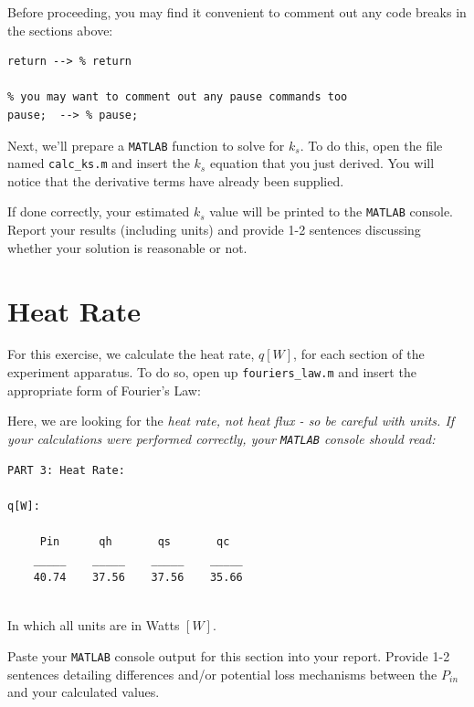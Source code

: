 \documentclass[11pt, letterpaper]{article}
\begin{document}
 Before proceeding, you may find it convenient to comment out any code breaks in the sections above:

\n
\begin{lstlisting}[numbers=none]
% comment out any return calls above
return --> % return

% you may want to comment out any pause commands too
pause;  --> % pause;
\end{lstlisting}

\n
Next, we'll prepare a \texttt{MATLAB} function to solve for $k_s$. To do this, open the file named \texttt{calc\_ks.m} and insert the $k_s$ equation that you just derived. You will notice that the derivative terms have already been supplied.

\begin{formal}
    \begin{deliv}  
    If done correctly, your estimated $k_s$ value will be printed to the \texttt{MATLAB} console. Report your results (including units) and provide 1-2 sentences discussing whether your solution is reasonable or not.
    \end{deliv}
\end{formal}


\section{Heat Rate}

For this exercise, we calculate the heat rate, $q [W]$, for each section of the experiment apparatus. To do so, open up \texttt{fouriers\_law.m} and insert the appropriate form of Fourier's Law:


Here, we are looking for the \it{heat rate}, not \it{heat flux} - so be careful with units. If your calculations were performed correctly, your \texttt{MATLAB} console should read:

\begin{lstlisting}[numbers=none]
PART 3: Heat Rate: 

q[W]: 

     Pin      qh       qs       qc  
    _____    _____    _____    _____
    40.74    37.56    37.56    35.66
 
\end{lstlisting}
In which all units are in Watts $[W]$.

\begin{formal}
    \begin{deliv}  
    Paste your \texttt{MATLAB} console output for this section into your report. Provide 1-2 sentences detailing differences and/or potential loss mechanisms between the $P_{in}$ and your calculated values.
    \end{deliv}
\end{formal}
\end{document}
